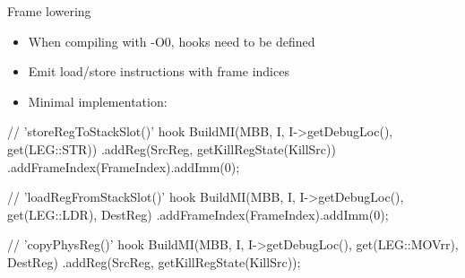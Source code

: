 \begin{frame}[fragile]{Frame lowering}

\begin{itemize}
    \item When compiling with  -O0, hooks need to be defined
    \item Emit load/store instructions with frame indices
    \item Minimal implementation:
\end{itemize}

\begin{codebox}
// 'storeRegToStackSlot()' hook
BuildMI(MBB, I, I->getDebugLoc(), get(LEG::STR))
  .addReg(SrcReg, getKillRegState(KillSrc))
  .addFrameIndex(FrameIndex).addImm(0);
\end{codebox}

\begin{codebox}
// 'loadRegFromStackSlot()' hook
BuildMI(MBB, I, I->getDebugLoc(), get(LEG::LDR), DestReg)
  .addFrameIndex(FrameIndex).addImm(0);
\end{codebox}

\begin{codebox}
// 'copyPhysReg()' hook
BuildMI(MBB, I, I->getDebugLoc(), get(LEG::MOVrr), DestReg)
  .addReg(SrcReg, getKillRegState(KillSrc));
\end{codebox}

\end{frame}
